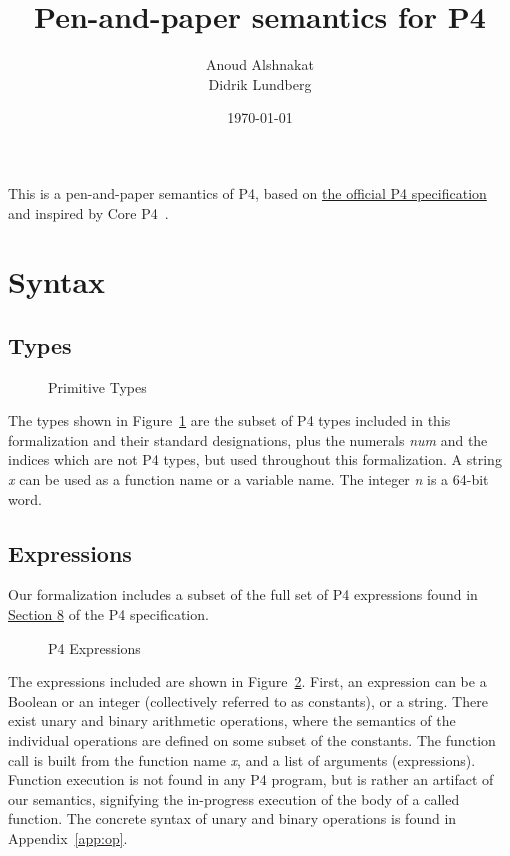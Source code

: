 \documentclass[UTF8]{article}
\title{%
Pen-and-paper semantics for P4}
\author{Anoud Alshnakat\\
Didrik Lundberg
}
\date{\today}
\begin{document}
\maketitle
\noindent
This is a pen-and-paper semantics of P4, based on \href{https://p4.org/p4-spec/docs/P4-16-v1.2.1.html}{the official P4 specification} and inspired by Core P4~\cite{doenges2021petr4}.

\section{Syntax}
\subsection{Types}
\newcommand{\num}{\textit{num}}
\newcommand{\str}{\textit{x}}
\newcommand{\inte}{\textit{n}}
%
%
\begin{figure}[h!]
\centering
\ottmetavars
\caption{Primitive Types}
\label{fig:types}
\end{figure}

The types shown in Figure~\ref{fig:types} are the subset of P4 types included in this formalization and their standard designations, plus the numerals \num{} and the indices which are not P4 types, but used throughout this formalization. A string \str{} can be used as a function name or a variable name. The integer \inte{} is a 64-bit word.

\newpage
\subsection{Expressions}
\newcommand{\fmap}{\textit{F}}

Our formalization includes a subset of the full set of P4 expressions found in \href{https://p4.org/p4-spec/docs/P4-16-v1.2.1.html#sec-exprs}{Section 8} of the P4 specification.

\begin{figure}[h!]
\centering\ottgrammartabular{
\ottexp\ottafterlastrule
}
\caption{P4 Expressions}
\label{fig:exp}
\end{figure}

The expressions included are shown in Figure~\ref{fig:exp}. First, an expression can be a Boolean or an integer (collectively referred to as constants), or a string. There exist unary and binary arithmetic operations, where the semantics of the individual operations are defined on some subset of the constants. The function call is built from the function name \str{}, and a list of arguments (expressions). Function execution is not found in any P4 program, but is rather an artifact of our semantics, signifying the in-progress execution of the body of a called function. The concrete syntax of unary and binary operations is found in Appendix~\ref{app:op}.
\end{document}
